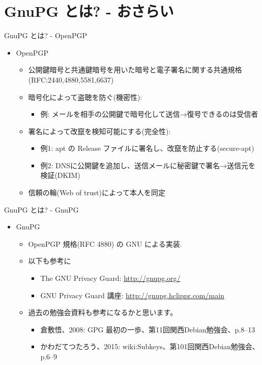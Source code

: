 \documentclass[cjk,c,squeeze,shrink,dvipdfmx,11pt,%
hyperref={bookmarks=true,bookmarksnumbered=true,bookmarksopen=false,%
colorlinks=false,%
pdftitle={},%
pdfauthor={}%
pdfinstitute={関西 Debian 勉強会},%
pdfsubject={},%
}]{beamer}
\begin{document}
\section{GnuPG とは? - おさらい}
\begin{frame}{GnuPG とは? - OpenPGP}
  \begin{itemize}
  \item %
    OpenPGP
    \begin{itemize}
    \item %
      公開鍵暗号と共通鍵暗号を用いた暗号と電子署名に関する共通規格
      (RFC:2440,4880,5581,6637)
    \item %
      暗号化によって盗聴を防ぐ(機密性):
      \begin{itemize}
      \item %
        例: メールを相手の公開鍵で暗号化して送信→復号できるのは受信者
      \end{itemize}
    \item %
      署名によって改竄を検知可能にする(完全性):
      \begin{itemize}
      \item %
        例1: apt の Release ファイルに署名し、改竄を防止する(secure-apt)
      \item %
        例2: DNSに公開鍵を追加し、送信メールに秘密鍵で署名→送信元を検証(DKIM)
      \end{itemize}
    \item %
      信頼の輪(Web of trust)によって本人を同定
    \end{itemize}
  \end{itemize}
\end{frame}
\begin{frame}{GnuPG とは? - GnuPG}
  \begin{itemize}
  \item %
    GnuPG
    \begin{itemize}
    \item %
      OpenPGP 規格(RFC 4880) の GNU による実装.
    \item %
      以下も参考に
      \begin{itemize}
      \item %
        The GNU Privacy Guard: \url{http://gnupg.org/}
      \item %
        GNU Privacy Guard 講座: \url{http://gnupg.hclippr.com/main}
      \end{itemize}
    \item %
      過去の勉強会資料も参考になるかと思います。
      \begin{itemize}
      \item %
        倉敷悟、2008: GPG 最初の一歩、第11回関西Debian勉強会、p.8--13
      \item %
        かわだてつたろう、2015: wiki:Subkeys、第101回関西Debian勉強会、p.6--9
      \end{itemize}
    \end{itemize}
  \end{itemize}
\end{frame}
\end{document}
